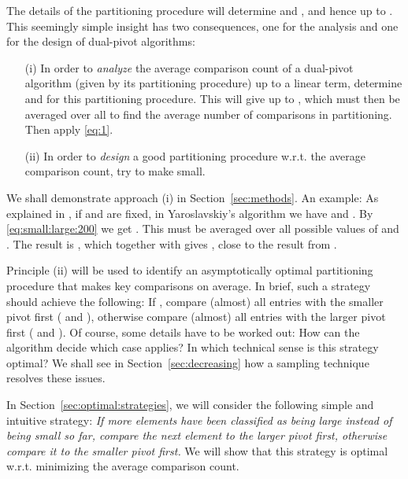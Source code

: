 \documentclass[prodmode,acmtalg]{acmsmall}
\begin{document}
The details of the partitioning procedure will determine  and , and hence
 up to .
This seemingly simple insight has two consequences, one for the analysis and one for the design of dual-pivot algorithms: 
\begin{itemize}
	\item[(i)] In order to \emph{analyze} the average comparison count of a
	    dual-pivot algorithm (given by its partitioning procedure) up to a linear term,
	determine  and  for this partitioning procedure. This will give
     up to , which must then be averaged over all  to find the
	average number of comparisons in partitioning. Then apply \eqref{eq:1}.
	\item[(ii)] In order to \emph{design} a good partitioning procedure w.r.t.
	    the average comparison count, try to
	    make  small.
\end{itemize}
We shall demonstrate approach (i) in Section~\ref{sec:methods}. An example: 
As explained in \cite{nebel12}, if  and  are fixed,  
in Yaroslavskiy's algorithm we have  and . 
By \eqref{eq:small:large:200} we get .
This must be averaged over all possible values of  and . The result is
,
which together with  gives , close
to the result  from \cite{nebel12}. 

Principle (ii) will be used to identify an asymptotically optimal partitioning procedure 
that makes 
key comparisons on average. 
In brief, such a strategy should achieve the following: 
	If , compare (almost) all entries with the smaller pivot first ( and ),
	otherwise compare (almost) all entries with the larger pivot first
	( and ). 
	Of course, some details have to be worked out:
	How can the algorithm decide which case applies? In which technical sense is this strategy optimal?
	We shall see in Section~\ref{sec:decreasing} how a sampling technique resolves these issues.
	

        In 
Section~\ref{sec:optimal:strategies}, we will consider the following simple and intuitive strategy:
\emph{If more elements have been classified as being large instead of being small so far,
compare the next element to the larger pivot first, otherwise compare it to the smaller
pivot first.}
We will show
that this strategy is optimal w.r.t. minimizing the average comparison count.
\end{document}
